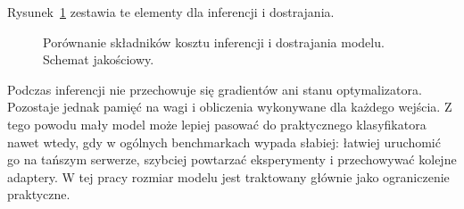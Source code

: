 Rysunek~\ref{fig:inference-finetuning-cost} zestawia te elementy dla inferencji
i dostrajania.

\begin{figure}[H]
\centering
\resizebox{0.98\textwidth}{!}{}
\caption[Porównanie kosztu inferencji i dostrajania]{Porównanie składników kosztu inferencji i dostrajania modelu.
Schemat jakościowy.}
\label{fig:inference-finetuning-cost}
\end{figure}

Podczas inferencji nie przechowuje się gradientów ani stanu optymalizatora.
Pozostaje jednak pamięć na wagi i obliczenia wykonywane dla każdego wejścia. Z
tego powodu mały model może lepiej pasować do praktycznego klasyfikatora nawet
wtedy, gdy w ogólnych benchmarkach wypada słabiej: łatwiej uruchomić go na
tańszym serwerze, szybciej powtarzać eksperymenty i przechowywać kolejne
adaptery. W tej pracy rozmiar modelu jest traktowany głównie jako ograniczenie
praktyczne.
